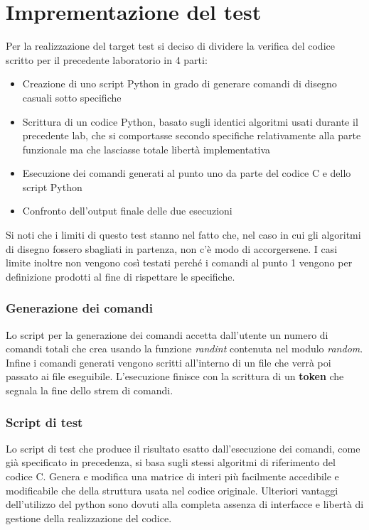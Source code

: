 \documentclass{article}
\begin{document}
\section{Imprementazione del test}
Per la realizzazione del target test si deciso di dividere la verifica del codice scritto per il precedente laboratorio in 4 parti:
\begin{itemize}
	\item Creazione di uno script Python in grado di generare comandi di disegno casuali sotto specifiche
	\item Scrittura di un codice Python, basato sugli identici algoritmi usati durante il precedente lab, che si comportasse secondo specifiche relativamente alla parte funzionale ma che lasciasse totale libertà implementativa
	\item Esecuzione dei comandi generati al punto uno da parte del codice C e dello script Python
	\item Confronto dell'output finale delle due esecuzioni
\end{itemize}
Si noti che i limiti di questo test stanno nel fatto che, nel caso in cui gli algoritmi di disegno fossero sbagliati in partenza, non c'è modo di accorgersene. I casi limite inoltre non vengono così testati perché i comandi al punto 1 vengono per definizione prodotti al fine di rispettare le specifiche.
\subsubsection*{Generazione dei comandi}
Lo script per la generazione dei comandi accetta dall'utente un numero di comandi totali che crea usando la funzione \textit{randint} contenuta nel modulo \textit{random}. Infine i comandi generati vengono scritti all'interno di un file che verrà poi passato ai file eseguibile.
L'esecuzione finisce con la scrittura di un \textbf{token} che segnala la fine dello strem di comandi.
\subsubsection*{Script di test}
Lo script di test che produce il risultato esatto dall'esecuzione dei comandi, come già specificato in precedenza, si basa sugli stessi algoritmi di riferimento del codice C. Genera e modifica una matrice di interi più facilmente accedibile e modificabile che della struttura usata nel codice originale. Ulteriori vantaggi dell'utilizzo del python sono dovuti alla completa assenza di interfacce e libertà di gestione della realizzazione del codice. 
\end{document}
